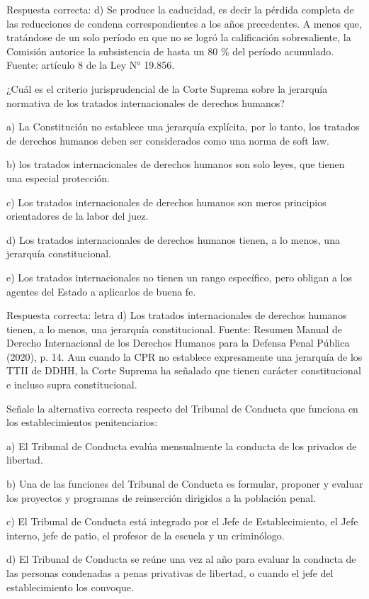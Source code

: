 \documentclass[letterpaper, 11pt]{article}
\begin{document}
Respuesta correcta:
d) Se produce la caducidad, es decir la pérdida completa de las
reducciones de condena correspondientes a los años precedentes. A menos que,
tratándose de un solo período en que no se logró la calificación sobresaliente, la Comisión
autorice la subsistencia de hasta un 80 \% del período acumulado.
Fuente: artículo 8 de la Ley N° 19.856.

¿Cuál es el criterio jurisprudencial de la Corte Suprema sobre la jerarquía normativa de
los tratados internacionales de derechos humanos?

a) La Constitución no establece una jerarquía explícita, por lo tanto, los tratados de
derechos humanos deben ser considerados como una norma de soft law.

b) los tratados internacionales de derechos humanos son solo leyes, que tienen una especial
protección.

c) Los tratados internacionales de derechos humanos son meros principios orientadores de
la labor del juez.

d) Los tratados internacionales de derechos humanos tienen, a lo menos, una jerarquía
constitucional.

e) Los tratados internacionales no tienen un rango específico, pero obligan a los agentes del
Estado a aplicarlos de buena fe.

Respuesta correcta:
letra d) Los tratados internacionales de derechos humanos tienen, a
lo menos, una jerarquía constitucional.
Fuente: Resumen Manual de Derecho Internacional de los Derechos Humanos para la
Defensa Penal Pública (2020), p. 14. Aun cuando la CPR no establece expresamente una
jerarquía de los TTII de DDHH, la Corte Suprema ha señalado que tienen carácter
constitucional e incluso supra constitucional.

Señale la alternativa correcta respecto del Tribunal de Conducta que funciona en los
establecimientos penitenciarios:

a) El Tribunal de Conducta evalúa mensualmente la conducta de los privados de libertad.

b) Una de las funciones del Tribunal de Conducta es formular, proponer y evaluar los
proyectos y programas de reinserción dirigidos a la población penal.

c) El Tribunal de Conducta está integrado por el Jefe de Establecimiento, el Jefe interno, jefe
de patio, el profesor de la escuela y un criminólogo.

d) El Tribunal de Conducta se reúne una vez al año para evaluar la conducta de las personas
condenadas a penas privativas de libertad, o cuando el jefe del establecimiento los
convoque.
\end{document}
